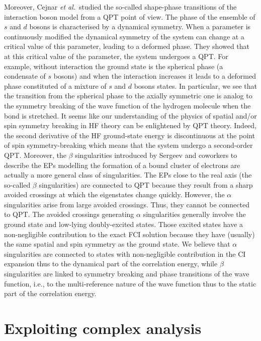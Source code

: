 \documentclass[aps,prb,reprint,noshowkeys,linenumbers,superscriptaddress]{revtex4-1}
\newcommand{\latin}[1]{#1}
\newcommand{\ie}{\latin{i.e.}}
\begin{document}
Moreover, Cejnar \textit{et al.}~studied the so-called shape-phase transitions of the interaction boson model from a QPT point of view. \cite{Cejnar_2000, Cejnar_2003, Cejnar_2007a, Cejnar_2009}
The phase of the ensemble of $s$ and $d$ bosons is characterised by a dynamical symmetry. 
When a parameter is continuously modified the dynamical symmetry of the system can change at a critical value of this parameter, leading to a deformed phase. 
They showed that at this critical value of the parameter, the system undergoes a QPT. 
For example, without interaction the ground state is the spherical phase (a condensate of $s$ bosons) and when the interaction increases it leads to a deformed phase constituted of a mixture of $s$ and $d$ bosons states. 
In particular, we see that the transition from the spherical phase to the axially symmetric one is analog to the symmetry breaking of the wave function of the hydrogen molecule when the bond is stretched. \cite{SzaboBook}
It seems like our understanding of the physics of spatial and/or spin symmetry breaking in HF theory can be enlightened by QPT theory. 
Indeed, the second derivative of the HF ground-state energy is discontinuous at the point of spin symmetry-breaking which means that the system undergo a second-order QPT. 
Moreover, the $\beta$ singularities introduced by Sergeev and coworkers to describe the EPs modelling the formation of a bound cluster of electrons are actually a more general class of singularities. 
The EPs close to the real axis (the so-called $\beta$ singularities) are connected to QPT because they result from a sharp avoided crossings at which the eigenstates change quickly. 
However, the $\alpha$ singularities arise from large avoided crossings. 
Thus, they cannot be connected to QPT. 
The avoided crossings generating $\alpha$ singularities generally involve the ground state and low-lying doubly-excited states. 
Those excited states have a non-negligible contribution to the exact FCI solution because they have (usually) the same spatial and spin symmetry as the ground state. 
We believe that $\alpha$ singularities are connected to states with non-negligible contribution in the CI expansion thus to the dynamical part of the correlation energy, while $\beta$ singularities are linked to symmetry breaking and phase transitions of the wave function, \ie, to the multi-reference nature of the wave function thus to the static part of the correlation energy.

\section{Exploiting complex analysis}
\end{document}
